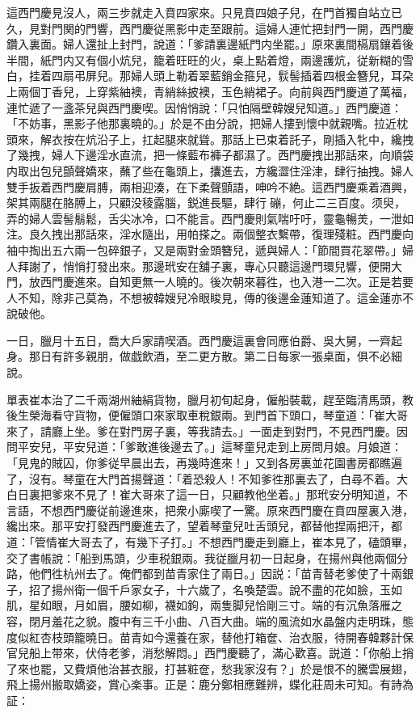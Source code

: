 這西門慶見沒人，兩三步就走入賁四家來。只見賁四娘子兒，在門首獨自站立已久，見對門関的門響，西門慶従黑影中走至跟前。這婦人連忙把封門一開，西門慶鑽入裏面。婦人還扯上封門，說道：「爹請裏邊紙門内坐罷。」原來裏間槅扇鑲着後半間，紙門内又有個小炕兒，籠着旺旺的火，桌上點着燈，兩邊護炕，従新糊的雪白，挂着四扇弔屏兒。那婦人頭上勒着翠藍銷金箍兒，䯼髻插着四根金簪兒，耳朶上兩個丁香兒，上穿紫紬襖，青綃絲披襖，玉色綃裙子。向前與西門慶道了萬福，連忙遞了一盞茶兒與西門慶喫。因悄悄說：「只怕隔壁韓嫂兒知道。」西門慶道：「不妨事，黑影子他那裏曉的。」於是不由分說，把婦人摟到懷中就親嘴。拉近枕頭來，解衣按在炕沿子上，扛起腿來就聳。那話上已束着託子，剛插入牝中，纔拽了幾拽，婦人下邊淫水直流，把一條藍布褲子都濕了。西門慶拽出那話來，向順袋内取出包兒顫聲嬌來，蘸了些在龜頭上，攮進去，方纔澀住淫津，肆行抽拽。婦人雙手扳着西門慶肩膊，兩相迎湊，在下柔聲顫語，呻吟不絶。這西門慶乘着酒興，架其兩腿在胳膊上，只顧没稜露腦，鋭進長驅，肆行𢵞磞，何止二三百度。须臾，弄的婦人雲髻鬅鬆，舌尖冰冷，口不能言。西門慶則氣喘吁吁，靈龜暢羙，一泄如注。良久拽出那話來，淫水隨出，用帕搽之。兩個整衣繫帶，復理殘粧。西門慶向袖中掏出五六兩一包碎銀子，又是兩對金頭簪兒，遞與婦人：「節間買花翠帶。」婦人拜謝了，悄悄打發出來。那邊玳安在舖子裏，專心只聽這邊門環兒響，便開大門，放西門慶進來。自知更無一人曉的。後次朝來暮徃，也入港一二次。正是若要人不知，除非己莫為，不想被韓嫂兒冷眼睃見，傳的後邊金蓮知道了。這金蓮亦不說破他。

一日，臘月十五日，喬大戶家請喫酒。西門慶這裏會同應伯爵、吳大舅，一齊起身。那日有許多親朋，做戯飲酒，至二更方散。第二日每家一張桌面，俱不必細說。

單表崔本治了二千兩湖州紬絹貨物，臘月初旬起身，僱船裝載，趕至臨清馬頭，教後生榮海看守貨物，便僱頭口來家取車稅銀兩。到門首下頭口，琴童道：「崔大哥來了，請廳上坐。爹在對門房子裏，等我請去。」一面走到對門，不見西門慶。因問平安兒，平安兒道：「爹敢進後邊去了。」這琴童兒走到上房問月娘。月娘道：「見鬼的賊囚，你爹従早晨出去，再幾時進來！」又到各房裏並花園書房都瞧遍了，沒有。琴童在大門首揚聲道：「着恐殺人！不知爹徃那裏去了，白尋不着。大白日裏把爹來不見了！崔大哥來了這一日，只顧教他坐着。」那玳安分明知道，不言語，不想西門慶従前邊進來，把衆小廝喫了一驚。原來西門慶在賁四屋裏入港，纔出來。那平安打發西門慶進去了，望着琴童兒吐舌頭兒，都替他捏兩把汗，都道：「管情崔大哥去了，有幾下子打。」不想西門慶走到廳上，崔本見了，磕頭畢，交了書帳說：「船到馬頭，少車税銀兩。我従臘月初一日起身，在揚州與他兩個分路，他們徃杭州去了。俺們都到苗青家住了兩日。」因説：「苗青替老爹使了十兩銀子，招了揚州衛一個千戶家女子，十六歲了，名喚楚雲。說不盡的花如臉，玉如肌，星如眼，月如眉，腰如柳，襪如鉤，兩隻脚兒恰剛三寸。端的有沉魚落雁之容，閉月羞花之貌。腹中有三千小曲、八百大曲。端的風流如水晶盤内走明珠，態度似紅杏枝頭籠曉日。苗青如今還養在家，替他打箱奩、治衣服，待開春韓夥計保官兒船上带來，伏侍老爹，消愁解悶。」西門慶聽了，滿心歡喜。説道：「你船上捎了來也罷，又費煩他治甚衣服，打甚粧奩，愁我家沒有？」於是恨不的騰雲展翅，飛上揚州搬取嬌姿，賞心楽事。正是：鹿分鄭相應難辨，蝶化莊周未可知。有詩為証：


